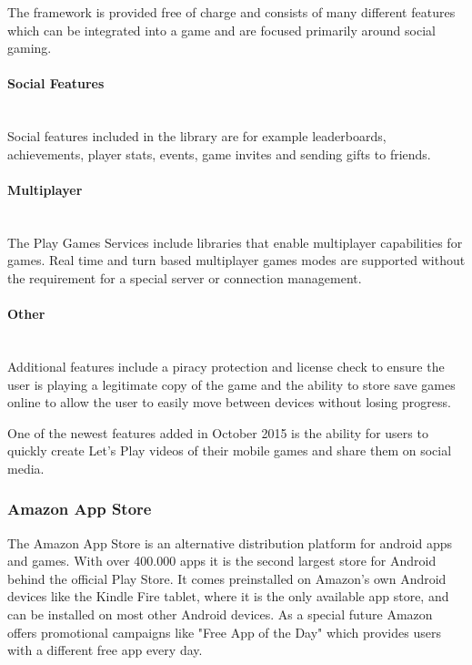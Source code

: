 The framework is provided free of charge and consists of many different features which can be integrated into a game and are focused primarily around social gaming. \citep{hartrell_unlocking_2014}

\paragraph{Social Features}\mbox{}\\
Social features included in the library are for example leaderboards, achievements, player stats, events, game invites and sending gifts to friends. 

\paragraph{Multiplayer}\mbox{}\\
The Play Games Services include libraries that enable multiplayer capabilities for games. Real time and turn based multiplayer games modes are supported without the requirement for a special server or connection management. \citep{google_play_2016}

\paragraph{Other}\mbox{}\\
Additional features include a piracy protection and license check to ensure the user is playing a legitimate copy of the game and the ability to store save games online to allow the user to easily move between devices without losing progress.

One of the newest features added in October 2015 is the ability for users to quickly create Let's Play videos of their mobile games and share them on social media. \citep{perez_android_2015}

\subsubsection{Amazon App Store}
\label{subsec:amazon_app_store}
The Amazon App Store is an alternative distribution platform for android apps and games. With over 400.000 apps it is the second largest store for Android behind the official Play Store. \citep{rubin_amazon_2015} It comes preinstalled on Amazon's own Android devices like the Kindle Fire tablet, where it is the only available app store, and can be installed on most other Android devices. As a special future Amazon offers promotional campaigns like "Free App of the Day" which provides users with a different free app every day.
 
